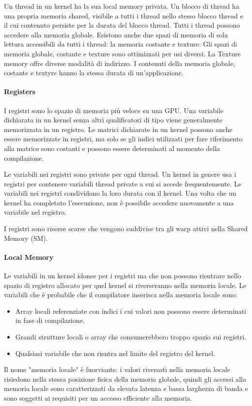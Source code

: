 Un thread in un kernel ha la sua local memory privata. Un blocco di thread ha una propria memoria shared, visibile a tutti i thread nello stesso blocco thread e il cui contenuto persiste per la durata del blocco thread. Tutti i thread possono accedere alla memoria globale. Esistono anche due spazi di memoria di sola lettura accessibili da tutti i thread: la memoria costante e texture. Gli spazi di memoria globale, costante e texture sono ottimizzati per usi diversi. La Texture memory offre diverse modalità di indirizzo. I contenuti della memoria globale, costante e textyre hanno la stessa durata di un'applicazione.
\paragraph{Registers}
I registri sono lo spazio di memoria più veloce su una GPU. Una variabile dichiarata in un kernel senza altri qualificatori di tipo viene generalmente memorizzata in un registro. Le matrici dichiarate in un kernel possono anche essere memorizzate in registri, ma solo se gli indici utilizzati per fare riferimento alla matrice sono costanti e possono essere determinati al momento della compilazione.

Le variabili nei registri sono private per ogni thread. Un kernel in genere usa i registri per contenere variabili thread private a cui si accede frequentemente. Le variabili nei registri condividono la loro durata con il kernel. Una volta che un kernel ha completato l'esecuzione, non è possibile accedere nuovamente a una variabile nel registro.

I registri sono risorse scarse che vengono suddivise tra gli warp attivi nella Shared Memory (SM).

\paragraph{Local Memory}
Le variabili in un kernel idonee per i registri ma che non possono rientrare nello spazio di registro allocato per quel kernel si riverseranno nella memoria locale. Le variabili che è probabile che il compilatore inserisca nella memoria locale sono:
\begin{itemize}
	\item Array locali referenziate con indici i cui valori non possono essere determinati in fase di compilazione.
	\item Grandi strutture locali o array che consumerebbero troppo spazio sui registri.
	\item Qualsiasi variabile che non rientra nel limite del registro del kernel.
\end{itemize}
Il nome "memoria locale" è fuorviante: i valori riversati nella memoria locale risiedono nella stessa posizione fisica della memoria globale, quindi gli accessi alla memoria locale sono caratterizzati da elevata latenza e bassa larghezza di banda e sono soggetti ai requisiti per un accesso efficiente alla memoria.

